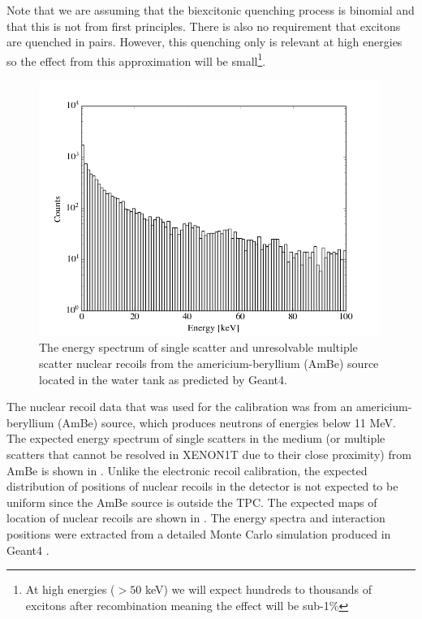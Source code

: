Note that we are assuming that the biexcitonic quenching process is binomial and that this is not from first principles.  There is also no requirement that excitons are quenched in pairs.  However, this quenching only is relevant at high energies so the effect from this approximation will be small\footnote{At high energies ($> 50$ keV) we will expect hundreds to thousands of excitons after recombination meaning the effect will be sub-1\%}.

\begin{figure}[t]
        \centering
	\includegraphics[width=0.99\textwidth]{xe1t_nr_energy_spec}
	\caption{The energy spectrum of single scatter and unresolvable multiple scatter nuclear recoils from the americium-beryllium (AmBe) source located in the water tank as predicted by Geant4.}
	\label{fig:xe1t_nr_energy_spec}
\end{figure}


The nuclear recoil data that was used for the calibration was from an americium-beryllium (AmBe) source, which produces neutrons of energies below 11 MeV.  The expected energy spectrum of single scatters in the medium (or multiple scatters that cannot be resolved in XENON1T due to their close proximity) from AmBe is shown in .  Unlike the electronic recoil calibration, the expected distribution of positions of nuclear recoils in the detector is not expected to be uniform since the AmBe source is outside the TPC.  The expected maps of location of nuclear recoils are shown in .  The energy spectra and interaction positions were extracted from a detailed Monte Carlo simulation produced in Geant4 \cite{agostinelli2003geant4}.



